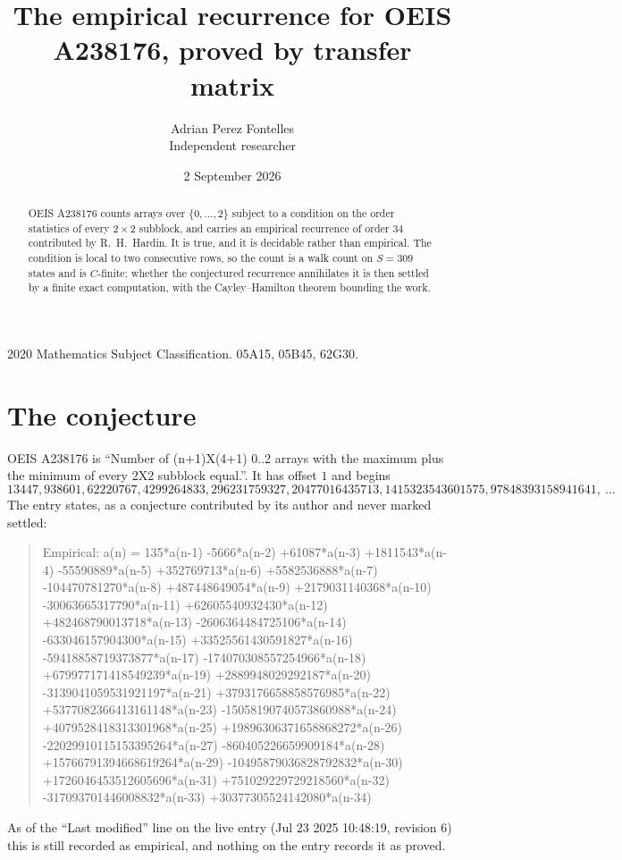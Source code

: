 \documentclass[11pt,a4paper]{article}
\title{The empirical recurrence for OEIS A238176, proved by transfer matrix}
\author{Adrian Perez Fontelles\\ \small Independent researcher}
\date{2 September 2026}
\theoremstyle{plain}
\theoremstyle{definition}
\begin{document}
\maketitle

\begin{abstract}
OEIS A238176 counts arrays over $\{0,\dots,2\}$ subject to a condition on the order
statistics of every $2\times2$ subblock, and carries an empirical recurrence of order
$34$ contributed by R.~H.~Hardin. It is true, and it is decidable rather than empirical.
The condition is local to two consecutive rows, so the count is a walk count on $S=309$
states and is $C$-finite; whether the conjectured recurrence annihilates it is then settled by
a finite exact computation, with the Cayley--Hamilton theorem bounding the work.
\end{abstract}

\noindent\small 2020 Mathematics Subject Classification. 05A15, 05B45, 62G30.\normalsize

\section{The conjecture}

OEIS A238176 is ``Number of (n+1)X(4+1) 0..2 arrays with the maximum plus the minimum of every 2X2 subblock equal.''. It has offset $1$ and begins
\[
13447, 938601, 62220767, 4299264833, 296231759327, 20477016435713, 1415323543601575, 97848393158941641,\ \dots
\]
The entry states, as a conjecture contributed by its author and never marked settled:
\begin{quote}
Empirical: a(n) = 135*a(n-1) -5666*a(n-2) +61087*a(n-3) +1811543*a(n-4) -55590889*a(n-5) +352769713*a(n-6) +5582536888*a(n-7) -104470781270*a(n-8) +487448649054*a(n-9) +2179031140368*a(n-10) -30063665317790*a(n-11) +62605540932430*a(n-12) +482468790013718*a(n-13) -2606364484725106*a(n-14) -633046157904300*a(n-15) +33525561430591827*a(n-16) -59418858719373877*a(n-17) -174070308557254966*a(n-18) +679977171418549239*a(n-19) +2889948029292187*a(n-20) -3139041059531921197*a(n-21) +3793176658858576985*a(n-22) +5377082366413161148*a(n-23) -15058190740573860988*a(n-24) +4079528418313301968*a(n-25) +19896306371658868272*a(n-26) -22029910115153395264*a(n-27) -860405226659909184*a(n-28) +15766791394668619264*a(n-29) -10495879036828792832*a(n-30) +1726046453512605696*a(n-31) +751029229729218560*a(n-32) -317093701446008832*a(n-33) +30377305524142080*a(n-34)
\end{quote}
As of the ``Last modified'' line on the live entry (Jul 23 2025 10:48:19, revision 6) this is still
recorded as empirical, and nothing on the entry records it as proved.
\end{document}
